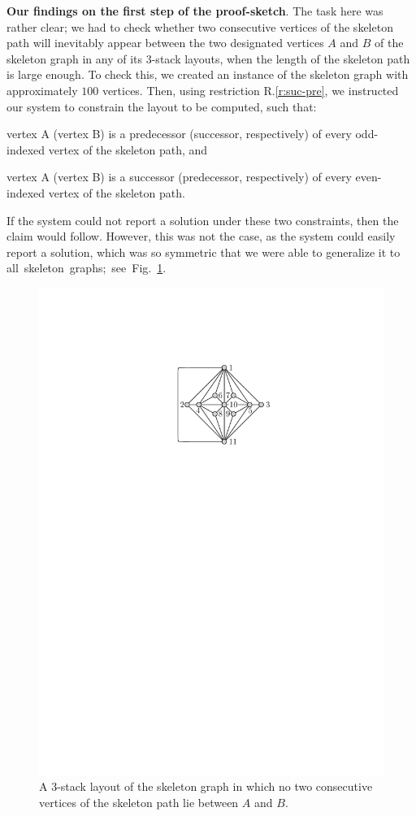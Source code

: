 \documentclass[runningheads]{llncs}
\newcommand{\myparagraph}[1]{\medskip\noindent\textbf{#1}.}
\begin{document}
\myparagraph{Our findings on the first step of the proof-sketch} The task here was rather clear; we had to check whether two consecutive vertices of the skeleton path will inevitably appear between the two designated vertices $A$ and $B$ of the skeleton graph in any of its $3$-stack layouts, when the length of the skeleton path is large enough. 
%
To check this, we created an instance of the skeleton graph with approximately $100$ vertices. Then, using restriction R.\ref{r:suc-pre}, we instructed our system to constrain the layout to be computed, such that: 
%
\begin{inparaenum}[(i)]
\item vertex A (vertex B) is a predecessor (successor, respectively) of every odd-indexed vertex of the skeleton path, and
\item vertex A (vertex B) is a successor (predecessor, respectively) of every even-indexed vertex of the skeleton path.
\end{inparaenum} 
%
If the system could not report a solution under these two constraints, then the claim would follow. However, this was not the case, as the system could easily report a solution, which was so symmetric that we were able to generalize it to all~skeleton~graphs;~see~Fig.~\ref{fig:c1}.

\begin{figure}[t]
   \centering
   \includegraphics[width=.80\textwidth,page=8]{graphs}
   \caption{%
   A $3$-stack layout of the skeleton graph in which no two consecutive vertices of the skeleton path lie between $A$ and $B$.}
   \label{fig:c1}
\end{figure}
\end{document}
